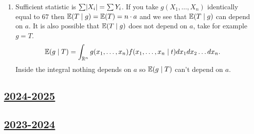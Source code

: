 \begin{enumerate}
    \item Sufficient statistic is $\sum \lvert X_i\rvert = \sum Y_i$.
    If you take $g(X_1, \dots, X_n)$ identically equal to $67$ then $\operatorname{\mathbb{E}}(T \mid g) = \operatorname{\mathbb{E}}(T) = n\cdot a$ and we see that $\operatorname{\mathbb{E}}(T \mid g)$ can depend on $a$.
    It is also possible that $\operatorname{\mathbb{E}}(T \mid g)$ does not depend on $a$, take for example $g = T$.
    \[
    \operatorname{\mathbb{E}}(g \mid T) = \int_{\mathbb{R}^n} g(x_1, \dots, x_n) f(x_1, \dots, x_n \mid t) dx_1 dx_2 \dots dx_n.
    \]
    Inside the integral nothing depends on $a$ so $\operatorname{\mathbb{E}}(g \mid T)$ can't depend on $a$. 


\end{enumerate}


\subsection[2024-2025]{\hyperref[sec:kr_04_2024_2025]{2024-2025}}
\label{sec:sol_kr_04_2024_2025} %


\subsection[2023-2024]{\hyperref[sec:kr_04_2023_2024]{2023-2024}}
\label{sec:sol_kr_04_2023_2024} %

